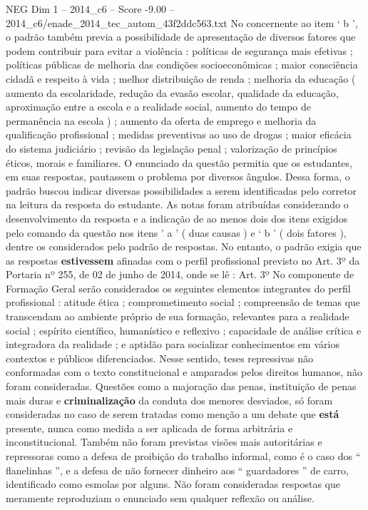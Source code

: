 \begin{textsample}{NEG Dim 1 – 2014\_c6 – Score -9.00 – 2014\_c6/enade\_2014\_tec\_autom\_43f2ddc563.txt}
No concernente ao item ‘ b ’, o padrão também previa a possibilidade de apresentação de diversos fatores que podem contribuir para evitar a violência : políticas de segurança mais efetivas ; políticas públicas de melhoria das condições socioeconômicas ; maior consciência cidadã e respeito à vida ; melhor distribuição de renda ; melhoria da educação ( aumento da escolaridade, redução da evasão escolar, qualidade da educação, aproximação entre a escola e a realidade social, aumento do tempo de permanência na escola ) ; aumento da oferta de emprego e melhoria da qualificação profissional ; medidas preventivas ao uso de drogas ; maior eficácia do sistema judiciário ; revisão da legislação penal ; valorização de princípios éticos, morais e familiares.
O enunciado da questão permitia que os estudantes, em suas respostas, pautassem o problema por diversos ângulos.
Dessa forma, o padrão buscou indicar diversas possibilidades a serem identificadas pelo corretor na leitura da resposta do estudante.
As notas foram atribuídas considerando o desenvolvimento da resposta e a indicação de ao menos dois dos itens exigidos pelo comando da questão nos itens ’ a ’ ( duas causas ) e ‘ b ’ ( dois fatores ), dentre os considerados pelo padrão de respostas.
No entanto, o padrão exigia que as respostas \textbf{estivessem} afinadas com o perfil profissional previsto no Art. 3º da Portaria nº 255, de 02 de junho de 2014, onde se lê : Art. 3º No componente de Formação Geral serão considerados os seguintes elementos integrantes do perfil profissional : atitude ética ; comprometimento social ; compreensão de temas que transcendam ao ambiente próprio de sua formação, relevantes para a realidade social ; espírito científico, humanístico e reflexivo ; capacidade de análise crítica e integradora da realidade ; e aptidão para socializar conhecimentos em vários contextos e públicos diferenciados.
Nesse sentido, teses repressivas não conformadas com o texto constitucional e amparados pelos direitos humanos, não foram consideradas.
Questões como a majoração das penas, instituição de penas mais duras e \textbf{criminalização} da conduta dos menores desviados, só foram consideradas no caso de serem tratadas como menção a um debate que \textbf{está} presente, nunca como medida a ser aplicada de forma arbitrária e inconstitucional.
Também não foram previstas visões mais autoritárias e repressoras como a defesa de proibição do trabalho informal, como é o caso dos “ flanelinhas ”, e a defesa de não fornecer dinheiro aos “ guardadores ” de carro, identificado como esmolas por alguns.
Não foram consideradas respostas que meramente reproduziam o enunciado sem qualquer reflexão ou análise.

\end{textsample}
